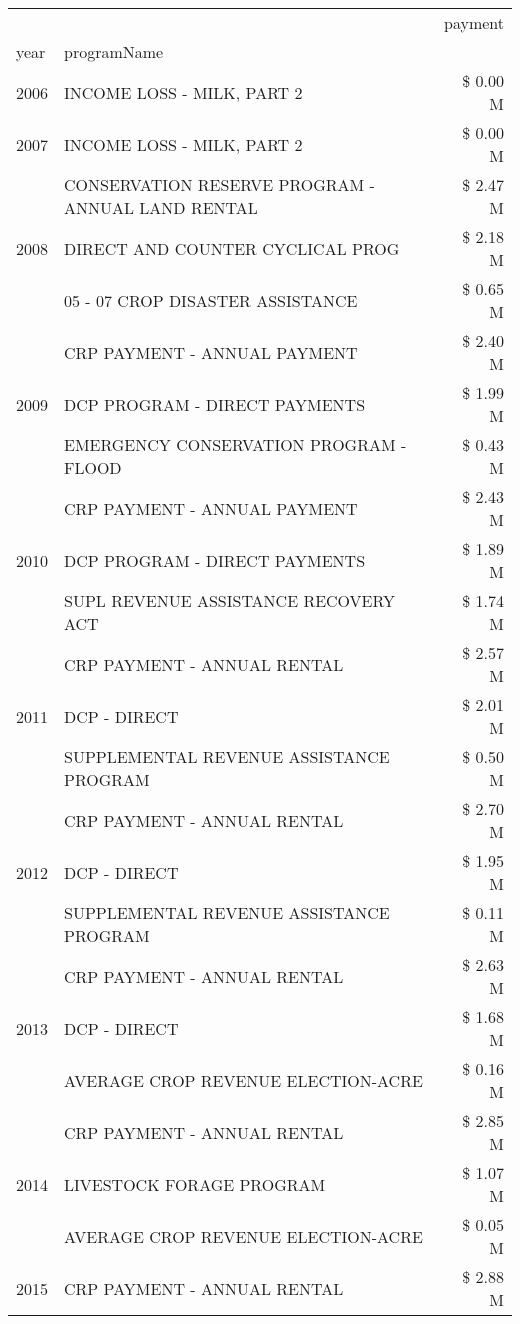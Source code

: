 \begin{tabular}{llr}
\toprule
 &  & payment \\
year & programName &  \\
\midrule
2006 & INCOME LOSS - MILK, PART 2 & \$ 0.00 M \\
\cline{1-3}
2007 & INCOME LOSS - MILK, PART 2 & \$ 0.00 M \\
\cline{1-3}
\multirow[t]{3}{*}{2008} & CONSERVATION RESERVE PROGRAM - ANNUAL LAND RENTAL & \$ 2.47 M \\
 & DIRECT AND COUNTER CYCLICAL PROG & \$ 2.18 M \\
 & 05 - 07 CROP DISASTER ASSISTANCE & \$ 0.65 M \\
\cline{1-3}
\multirow[t]{3}{*}{2009} & CRP PAYMENT - ANNUAL PAYMENT & \$ 2.40 M \\
 & DCP PROGRAM - DIRECT PAYMENTS & \$ 1.99 M \\
 & EMERGENCY CONSERVATION PROGRAM - FLOOD & \$ 0.43 M \\
\cline{1-3}
\multirow[t]{3}{*}{2010} & CRP PAYMENT - ANNUAL PAYMENT & \$ 2.43 M \\
 & DCP PROGRAM - DIRECT PAYMENTS & \$ 1.89 M \\
 & SUPL REVENUE ASSISTANCE RECOVERY ACT & \$ 1.74 M \\
\cline{1-3}
\multirow[t]{3}{*}{2011} & CRP PAYMENT - ANNUAL RENTAL & \$ 2.57 M \\
 & DCP - DIRECT & \$ 2.01 M \\
 & SUPPLEMENTAL REVENUE ASSISTANCE PROGRAM & \$ 0.50 M \\
\cline{1-3}
\multirow[t]{3}{*}{2012} & CRP PAYMENT - ANNUAL RENTAL & \$ 2.70 M \\
 & DCP - DIRECT & \$ 1.95 M \\
 & SUPPLEMENTAL REVENUE ASSISTANCE PROGRAM & \$ 0.11 M \\
\cline{1-3}
\multirow[t]{3}{*}{2013} & CRP PAYMENT - ANNUAL RENTAL & \$ 2.63 M \\
 & DCP - DIRECT & \$ 1.68 M \\
 & AVERAGE CROP REVENUE ELECTION-ACRE & \$ 0.16 M \\
\cline{1-3}
\multirow[t]{3}{*}{2014} & CRP PAYMENT - ANNUAL RENTAL & \$ 2.85 M \\
 & LIVESTOCK FORAGE PROGRAM & \$ 1.07 M \\
 & AVERAGE CROP REVENUE ELECTION-ACRE & \$ 0.05 M \\
\cline{1-3}
\multirow[t]{3}{*}{2015} & CRP PAYMENT - ANNUAL RENTAL & \$ 2.88 M \\

\end{tabular}
